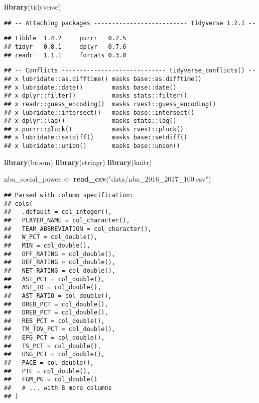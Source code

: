 \documentclass[]{article}
\title{}
\subtitle{Project Proposal}
\author{Pipe It Up!: Nagaprasad Rudrapatna, Karen Deng, Jack Muraika, Anna
Zolotor}
\date{2020-03-01}
\newenvironment{Shaded}{\begin{snugshade}}{\end{snugshade}}
\newcommand{\KeywordTok}[1]{\textcolor[rgb]{0.13,0.29,0.53}{\textbf{#1}}}
\newcommand{\NormalTok}[1]{#1}
\newcommand{\StringTok}[1]{\textcolor[rgb]{0.31,0.60,0.02}{#1}}
\begin{document}
\begin{Shaded}
\begin{Highlighting}[]
\KeywordTok{library}\NormalTok{(tidyverse)}
\end{Highlighting}
\end{Shaded}

\begin{verbatim}
## -- Attaching packages -------------------------- tidyverse 1.2.1 --
\end{verbatim}

\begin{verbatim}
## tibble  1.4.2     purrr   0.2.5
## tidyr   0.8.1     dplyr   0.7.6
## readr   1.1.1     forcats 0.3.0
\end{verbatim}

\begin{verbatim}
## -- Conflicts ----------------------------- tidyverse_conflicts() --
## x lubridate::as.difftime() masks base::as.difftime()
## x lubridate::date()        masks base::date()
## x dplyr::filter()          masks stats::filter()
## x readr::guess_encoding()  masks rvest::guess_encoding()
## x lubridate::intersect()   masks base::intersect()
## x dplyr::lag()             masks stats::lag()
## x purrr::pluck()           masks rvest::pluck()
## x lubridate::setdiff()     masks base::setdiff()
## x lubridate::union()       masks base::union()
\end{verbatim}

\begin{Shaded}
\begin{Highlighting}[]
\KeywordTok{library}\NormalTok{(broom)}
\KeywordTok{library}\NormalTok{(stringr)}
\KeywordTok{library}\NormalTok{(knitr)}
\end{Highlighting}
\end{Shaded}

\begin{Shaded}
\begin{Highlighting}[]
\NormalTok{nba_social_power <-}\StringTok{ }\KeywordTok{read_csv}\NormalTok{(}\StringTok{"data/nba_2016_2017_100.csv"}\NormalTok{)}
\end{Highlighting}
\end{Shaded}

\begin{verbatim}
## Parsed with column specification:
## cols(
##   .default = col_integer(),
##   PLAYER_NAME = col_character(),
##   TEAM_ABBREVIATION = col_character(),
##   W_PCT = col_double(),
##   MIN = col_double(),
##   OFF_RATING = col_double(),
##   DEF_RATING = col_double(),
##   NET_RATING = col_double(),
##   AST_PCT = col_double(),
##   AST_TO = col_double(),
##   AST_RATIO = col_double(),
##   OREB_PCT = col_double(),
##   DREB_PCT = col_double(),
##   REB_PCT = col_double(),
##   TM_TOV_PCT = col_double(),
##   EFG_PCT = col_double(),
##   TS_PCT = col_double(),
##   USG_PCT = col_double(),
##   PACE = col_double(),
##   PIE = col_double(),
##   FGM_PG = col_double()
##   # ... with 8 more columns
## )
\end{verbatim}
\end{document}
